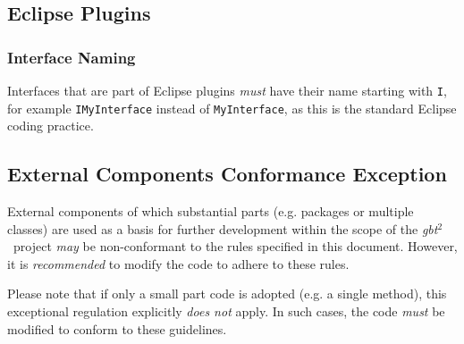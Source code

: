 \documentclass[a4paper,12pt,liststotoc,DIV12]{scrartcl}
\newcommand{\gbt}{\textit{gbt$^2$}}
\begin{document}
\subsection{Eclipse Plugins}
\label{sec:specific:eclipse-plugins}

\subsubsection{Interface Naming}
\label{sec:eclipse:interface-naming}

Interfaces that are part of Eclipse plugins \emph{must} have their name
starting with \texttt{I}, for example \texttt{IMyInterface} instead of
\texttt{MyInterface}, as this is the standard Eclipse coding practice.

\subsection{External Components Conformance Exception}
\label{sec:specific:external-components}

External components of which substantial parts (e.g. packages or multiple
classes) are used as a basis for further development within the scope of the
\gbt\ project \emph{may} be non-conformant to the rules specified in this
document. However, it is \emph{recommended} to modify the code to adhere to
these rules.

Please note that if only a small part code is adopted (e.g. a single method),
this exceptional regulation explicitly \emph{does not} apply. In such cases,
the code \emph{must} be modified to conform to these guidelines.


\end{document}
